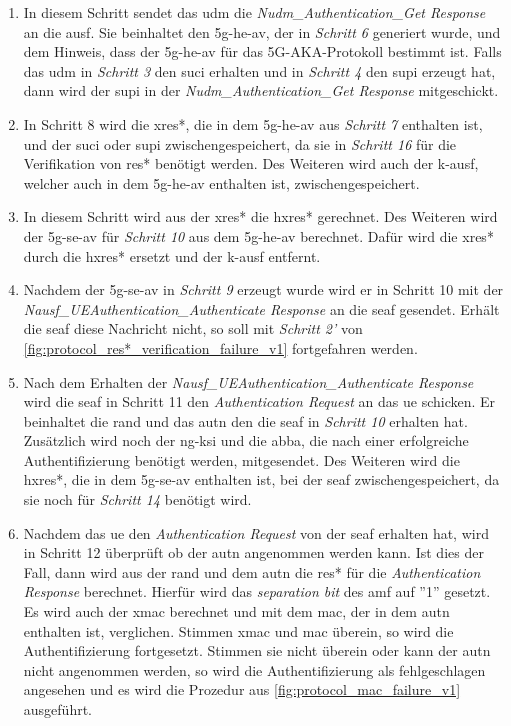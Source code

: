 \begin{enumerate}
\item In diesem Schritt sendet das \gls{udm} die \textit{Nudm\_Authentication\_Get Response} an die \gls{ausf}.
Sie beinhaltet den \gls{5g-he-av}, der in \textit{Schritt 6} generiert wurde, und dem Hinweis, dass der \gls{5g-he-av} für das 5G-AKA-Protokoll bestimmt ist.
Falls das \gls{udm} in \textit{Schritt 3} den \gls{suci} erhalten und in \textit{Schritt 4} den \gls{supi} erzeugt hat, dann wird der \gls{supi} in der \textit{Nudm\_Authentication\_Get Response} mitgeschickt.

\item In Schritt 8 wird die \gls{xres*}, die in dem \gls{5g-he-av} aus \textit{Schritt 7} enthalten ist, und der \gls{suci} oder \gls{supi} zwischengespeichert, da sie in \textit{Schritt 16} für die Verifikation von \gls{res*} benötigt werden.
Des Weiteren wird auch der \gls{k-ausf}, welcher auch in dem \gls{5g-he-av} enthalten ist, zwischengespeichert.

\item In diesem Schritt wird aus der \gls{xres*} die \gls{hxres*} gerechnet.
Des Weiteren wird der \gls{5g-se-av} für \textit{Schritt 10} aus dem \gls{5g-he-av} berechnet.
Dafür wird die \gls{xres*} durch die \gls{hxres*} ersetzt und der \gls{k-ausf} entfernt.

\item Nachdem der \gls{5g-se-av} in \textit{Schritt 9} erzeugt wurde wird er in Schritt 10 mit der \textit{Nausf\_UEAuthentication\_Authenticate Response} an die \gls{seaf} gesendet.
Erhält die \gls{seaf} diese Nachricht nicht, so soll mit \textit{Schritt 2'} von \cref{fig:protocol_res*_verification_failure_v1} fortgefahren werden.

\item Nach dem Erhalten der \textit{Nausf\_UEAuthentication\_Authenticate Response} wird die \gls{seaf} in Schritt 11 den \textit{Authentication Request}  an das \gls{ue} schicken.
Er beinhaltet die \gls{rand} und das \gls{autn} den die \gls{seaf} in \textit{Schritt 10} erhalten hat.
Zusätzlich wird noch der \gls{ng-ksi} und die \gls{abba}, die nach einer erfolgreiche Authentifizierung benötigt werden, mitgesendet.
Des Weiteren wird die \gls{hxres*}, die in dem \gls{5g-se-av} enthalten ist, bei der \gls{seaf} zwischengespeichert, da sie noch für \textit{Schritt 14} benötigt wird.

\item Nachdem das \gls{ue} den \textit{Authentication Request} von der \gls{seaf} erhalten hat, wird in Schritt 12 überprüft ob der \gls{autn} angenommen werden kann.
Ist dies der Fall, dann wird aus der \gls{rand} und dem \gls{autn} die \gls{res*} für die \textit{Authentication Response} berechnet.
Hierfür wird das \textit{separation bit} des \gls{amf} auf ''1'' gesetzt.
Es wird auch der \gls{xmac} berechnet und mit dem \gls{mac}, der in dem \gls{autn} enthalten ist, verglichen.
Stimmen \gls{xmac} und \gls{mac} überein, so wird die Authentifizierung fortgesetzt.
Stimmen sie nicht überein oder kann der \gls{autn} nicht angenommen werden, so wird die Authentifizierung als fehlgeschlagen angesehen und es wird die Prozedur aus \cref{fig:protocol_mac_failure_v1} ausgeführt.


\end{enumerate}
